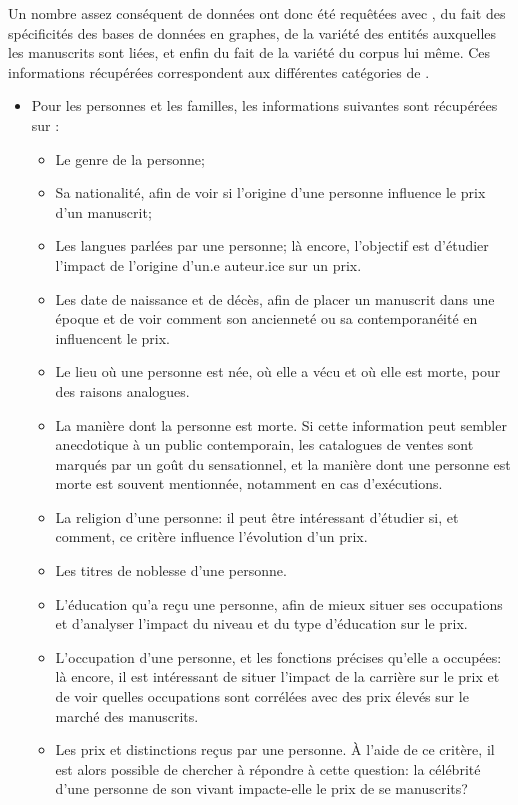 Un nombre assez conséquent de données ont donc été requêtées avec \sparql{}, du fait des spécificités des bases de données en graphes, de la variété des entités \wkd{} auxquelles les manuscrits sont liées, et enfin du fait de la variété du corpus lui même. Ces informations récupérées correspondent aux différentes catégories de \wkd{}.
\begin{itemize}
	\item Pour les personnes et les familles, les informations suivantes sont récupérées sur \wkd{}:
	\begin{itemize}
		\item Le genre de la personne;
		\item Sa nationalité, afin de voir si l'origine d'une personne influence le prix d'un manuscrit;
		\item Les langues parlées par une personne; là encore, l'objectif est d'étudier l'impact de l'origine d'un.e auteur.ice sur un prix.
		\item Les date de naissance et de décès, afin de placer un manuscrit dans une époque et de voir comment son ancienneté ou sa contemporanéité en influencent le prix.
		\item Le lieu où une personne est née, où elle a vécu et où elle est morte, pour des raisons analogues.
		\item La manière dont la personne est morte. Si cette information peut sembler anecdotique à un public contemporain, les catalogues de ventes sont marqués par un goût du sensationnel, et la manière dont une personne est morte est souvent mentionnée, notamment en cas d'exécutions.
		\item La religion d'une personne: il peut être intéressant d'étudier si, et comment, ce critère influence l'évolution d'un prix.
		\item Les titres de noblesse d'une personne.
		\item L'éducation qu'a reçu une personne, afin de mieux situer ses occupations et d'analyser l'impact du niveau et du type d'éducation sur le prix.
		\item L'occupation d'une personne, et les fonctions précises qu'elle a occupées: là encore, il est intéressant de situer l'impact de la carrière sur le prix et de voir quelles occupations sont corrélées avec des prix élevés sur le marché des manuscrits.
		\item Les prix et distinctions reçus par une personne. À l'aide de ce critère, il est alors possible de chercher à répondre à cette question: la célébrité d'une personne de son vivant impacte-elle le prix de se manuscrits?

\end{itemize}
\end{itemize}
